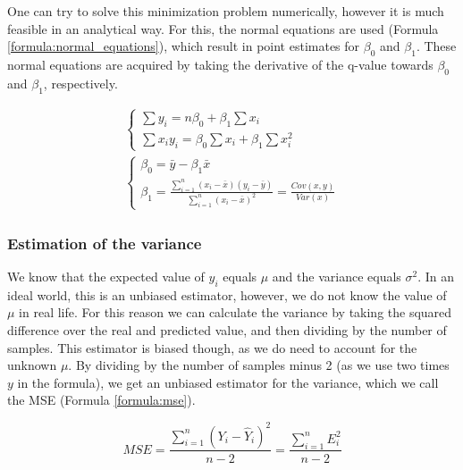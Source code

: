 One can try to solve this minimization problem numerically, however it is much feasible in an analytical way.
For this, the normal equations are used (Formula \ref{formula:normal_equations}), which result in point estimates for $\beta_0$ and $\beta_1$.
These normal equations are acquired by taking the derivative of the q-value towards $\beta_0$ and $\beta_1$, respectively.

\begin{equation}
    \begin{array}{ll}
        \left\{
            \begin{array}{ll}
                \sum y_i = n\beta_0 + \beta_1 \sum x_i \\
                \sum x_i y_i = \beta_0 \sum x_i + \beta_1 \sum x_i^2
            \end{array}
        \right. \\ [10pt]

        \left\{
            \begin{array}{ll}
                \beta_0 = \bar{y} - \beta_1 \bar{x} \\
                \beta_1 = \frac{\sum_{i=1}^n (x_i - \bar{x}) (y_i - \bar{y})}{\sum_{i=1}^{n} (x_i - \bar{x})^2} = \frac{Cov(x,y)}{Var(x)}
            \end{array}
        \right.
    \end{array}
    \label{formula:normal_equations}
\end{equation}

\subsubsection{Estimation of the variance}

We know that the expected value of $y_i$ equals $\mu$ and the variance equals $\sigma^2$.
In an ideal world, this is an unbiased estimator, however, we do not know the value of $\mu$ in real life.
For this reason we can calculate the variance by taking the squared difference over the real and predicted value, and then dividing by the number of samples.
This estimator is biased though, as we do need to account for the unknown $\mu$.
By dividing by the number of samples minus 2 (as we use two times $y$ in the formula), we get an unbiased estimator for the variance, which we call the MSE (Formula \ref{formula:mse}).

\begin{equation}
    MSE = \frac{\sum_{i=1}^n (Y_i - \hat{Y}_i)^2}{n - 2} = \frac{\sum_{i=1}^n E_i^2}{n - 2}
    \label{formula:mse}
\end{equation}

